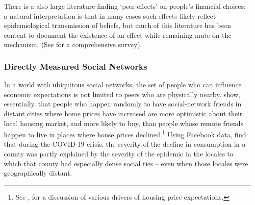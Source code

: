 There is a also large literature finding `peer effects' on people's financial choices; a natural interpretation is that in many cases such effects likely reflect epidemiological transmission of beliefs, but much of this literature has been content to document the existence of an effect while remaining mute on the mechanism.  (See \cite{kuchler2021social} for a comprehensive survey).



\subsubsection{Directly Measured Social Networks}

In a world with ubiquitous social networks, the set of people who can influence economic expectations is not limited to peers who are physically nearby.  \href{https://www.journals.uchicago.edu/doi/abs/10.1086/700073}{\cite{bailey2018economic,bailey2019house}} show, essentially, that people who happen randomly to have social-network friends in distant cities where home prices have increased are more optimistic about their local housing market, and more likely to buy, than people whose remote friends happen to live in places where house prices declined.\footnote{See \kpshousingexpectationFull, for a discussion of various drivers of housing price expectations.}  Using Facebook data, \cite{makridis2020learning} find that during the COVID-19 crisis, the severity of the decline in consumption in a county was partly explained by the severity of the epidemic in the locales to which that county had especially dense social ties -- even when those locales were geographically distant.

